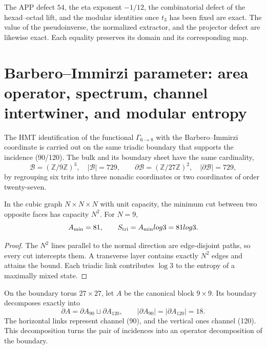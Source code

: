 \begin{remark}
The APP defect \(54\), the eta exponent \(-1/12\), the combinatorial
defect of the hexad--octad lift, and the
modular identities once \(t_3\) has been fixed are exact. The value
of the pseudoinverse, the normalized extractor, and the projector defect are likewise exact.
Each equality preserves its domain and its corresponding map.
\end{remark}


\section{Barbero--Immirzi parameter: area operator, spectrum,
channel intertwiner, and modular entropy}
\label{p12-83-c14-s2:sec:area-entrelazamiento-barbero-rev11}

The HMT identification of the functional \(\Gamma_{6\to8}\) with the
Barbero--Immirzi coordinate is carried out on the same triadic boundary that supports the
incidence (90/120). The bulk and its boundary sheet have the same cardinality,
\[
 \mathcal B=(\mathbb Z/9\mathbb Z)^3,
 \quad |\mathcal B|=729,
 \qquad
 \partial\mathcal B=(\mathbb Z/27\mathbb Z)^2,
 \quad |\partial\mathcal B|=729,
\]
by regrouping six trits into three nonadic coordinates or two
coordinates of order twenty-seven.

\begin{theorem}
\label{p12-83-c14-s2:thm:ley-areal-corte-triadico-rev11}
In the cubic graph \(N\times N\times N\) with unit capacity, the minimum
cut between two opposite faces has capacity \(N^2\). For \(N=9\),
\[
 \mathcal A_{\min}=81,
 \qquad S_{\rm tri}=\mathcal A_{\min}\log3=81\log3.
\]
\end{theorem}
\begin{proof}
The \(N^2\) lines parallel to the normal direction are edge-disjoint
paths, so every cut intercepts them. A transverse layer contains
exactly \(N^2\) edges and attains the bound. Each triadic link contributes
\(\log3\) to the entropy of a maximally mixed state.
\end{proof}

On the boundary torus \(27\times27\), let \(A\) be the canonical block
\(9\times9\). Its boundary decomposes exactly into
\begin{equation}
 \partial A=\partial A_{90}\sqcup\partial A_{120},
 \qquad |\partial A_{90}|=|\partial A_{120}|=18.
 \label{p12-83-c14-s2:eq:corte-90-120-rev11}
\end{equation}
The horizontal links represent channel (90), and the vertical ones
channel (120). This decomposition turns the pair of incidences into an
operator decomposition of the boundary.

